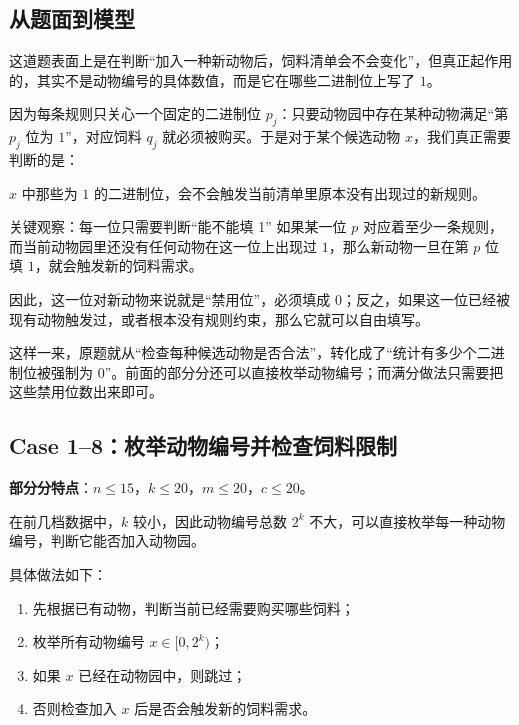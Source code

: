 \documentclass{book}
\begin{document}
\subsection{从题面到模型}

这道题表面上是在判断“加入一种新动物后，饲料清单会不会变化”，但真正起作用的，其实不是动物编号的具体数值，而是它在哪些二进制位上写了 $1$。

因为每条规则只关心一个固定的二进制位 $p_j$：只要动物园中存在某种动物满足“第 $p_j$ 位为 $1$”，对应饲料 $q_j$ 就必须被购买。于是对于某个候选动物 $x$，我们真正需要判断的是：

\begin{center}
$x$ 中那些为 $1$ 的二进制位，会不会触发当前清单里原本没有出现过的新规则。
\end{center}

\begin{keybox}{关键观察：每一位只需要判断“能不能填 1”}
如果某一位 $p$ 对应着至少一条规则，而当前动物园里还没有任何动物在这一位上出现过 $1$，那么新动物一旦在第 $p$ 位填 $1$，就会触发新的饲料需求。

因此，这一位对新动物来说就是“禁用位”，必须填成 $0$；反之，如果这一位已经被现有动物触发过，或者根本没有规则约束，那么它就可以自由填写。
\end{keybox}

这样一来，原题就从“检查每种候选动物是否合法”，转化成了“统计有多少个二进制位被强制为 $0$”。前面的部分分还可以直接枚举动物编号；而满分做法只需要把这些禁用位数出来即可。

\subsection{Case 1--8：枚举动物编号并检查饲料限制}
\textbf{部分分特点}：$n \le 15$，$k \le 20$，$m \le 20$，$c \le 20$。  

   在前几档数据中，$k$ 较小，因此动物编号总数 $2^k$ 不大，可以直接枚举每一种动物编号，判断它能否加入动物园。

具体做法如下：

\begin{enumerate}[leftmargin=2em,itemsep=1pt,topsep=2pt,parsep=0pt,partopsep=0pt]
    \item 先根据已有动物，判断当前已经需要购买哪些饲料；
    \item 枚举所有动物编号 $x\in[0,2^k)$；
    \item 如果 $x$ 已经在动物园中，则跳过；
    \item 否则检查加入 $x$ 后是否会触发新的饲料需求。
\end{enumerate}
\end{document}
